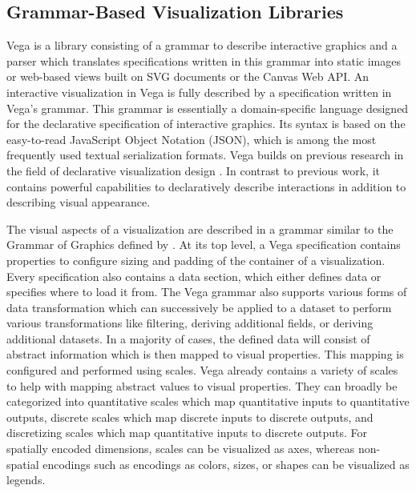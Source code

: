 \subsection{Grammar-Based Visualization Libraries}

Vega \parencite{Vega} is a library consisting of a grammar to describe
interactive graphics and a parser which translates specifications
written in this grammar into static images or web-based views built on
SVG documents or the Canvas Web API. An interactive visualization in
Vega is fully described by a specification written in Vega's grammar.
This grammar is essentially a domain-specific language designed for
the declarative specification of interactive graphics. Its syntax is
based on the easy-to-read JavaScript Object Notation (JSON), which is
among the most frequently used textual serialization formats. Vega
builds on previous research in the field of declarative visualization
design \parencite{GrammarOfGraphics}. In contrast to previous work, it
contains powerful capabilities to declaratively describe interactions
\parencite{ReactiveVega} in addition to describing visual appearance.

The visual aspects of a visualization are described in a grammar
similar to the Grammar of Graphics defined by
\textcite{GrammarOfGraphics}. At its top level, a Vega specification
contains properties to configure sizing and padding of the container
of a visualization. Every specification also contains a data section,
which either defines data or specifies where to load it from. The
Vega grammar also supports various forms of data transformation which
can successively be applied to a dataset to perform various
transformations like filtering, deriving additional fields, or
deriving additional datasets. In a majority of cases, the defined data
will consist of abstract information which is then mapped to visual
properties. This mapping is configured and performed using scales.
Vega already contains a variety of scales to help with mapping
abstract values to visual properties. They can broadly be categorized
into quantitative scales which map quantitative inputs to quantitative
outputs, discrete scales which map discrete inputs to discrete
outputs, and discretizing scales which map quantitative inputs to
discrete outputs. For spatially encoded dimensions, scales can
be visualized as axes, whereas non-spatial encodings such as encodings
as colors, sizes, or shapes can be visualized as legends.


